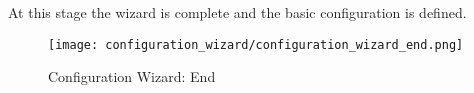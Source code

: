 \newpage

At this stage the wizard is complete and the basic configuration is defined.

\begin{figure}[H]
\centering
\texttt{[image: configuration\_wizard/configuration\_wizard\_end.png]}
\caption{Configuration Wizard: End}
\label{fig:configuration_wizard_end}
\end{figure}

